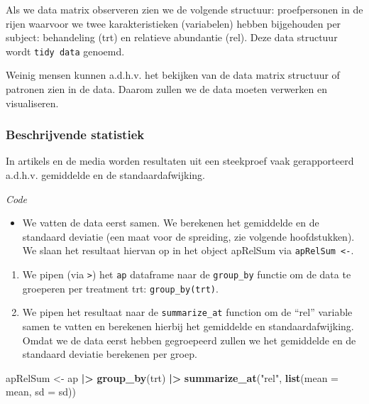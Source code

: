 \documentclass[
  12pt,dutch]{book}
\newenvironment{Shaded}{\begin{snugshade}}{\end{snugshade}}
\newcommand{\AttributeTok}[1]{\textcolor[rgb]{0.13,0.29,0.53}{#1}}
\newcommand{\FunctionTok}[1]{\textcolor[rgb]{0.13,0.29,0.53}{\textbf{#1}}}
\newcommand{\NormalTok}[1]{#1}
\newcommand{\OtherTok}[1]{\textcolor[rgb]{0.56,0.35,0.01}{#1}}
\newcommand{\SpecialCharTok}[1]{\textcolor[rgb]{0.81,0.36,0.00}{\textbf{#1}}}
\newcommand{\StringTok}[1]{\textcolor[rgb]{0.31,0.60,0.02}{#1}}
\providecommand{\tightlist}{%
  \setlength{\itemsep}{0pt}\setlength{\parskip}{0pt}}
\theoremstyle{definition}
\theoremstyle{definition}
\theoremstyle{definition}
\theoremstyle{definition}
\theoremstyle{remark}
\begin{document}
Als we data matrix observeren zien we de volgende structuur:
proefpersonen in de rijen waarvoor we twee karakteristieken (variabelen) hebben bijgehouden per subject:
behandeling (trt) en relatieve abundantie (rel).
Deze data structuur wordt \texttt{tidy\ data} genoemd.

Weinig mensen kunnen a.d.h.v. het bekijken van de data matrix structuur of patronen zien in de data. Daarom zullen we de data moeten verwerken en visualiseren.

\subsubsection{Beschrijvende statistiek}\label{beschrijvende-statistiek}

In artikels en de media worden resultaten uit een steekproef vaak gerapporteerd a.d.h.v. gemiddelde en de standaardafwijking.

\emph{Code}

\begin{itemize}
\tightlist
\item
  We vatten de data eerst samen. We berekenen het gemiddelde en de standaard deviatie (een maat voor de spreiding, zie volgende hoofdstukken).
  We slaan het resultaat hiervan op in het object apRelSum via \texttt{apRelSum\ \textless{}-}.
\end{itemize}

\begin{enumerate}
\def\labelenumi{\arabic{enumi}.}
\item
  We pipen (via \texttt{\textbar{}\textgreater{}}) het \texttt{ap} dataframe naar de \texttt{group\_by} functie om de data te groeperen per treatment trt: \texttt{group\_by(trt)}.
\item
  We pipen het resultaat naar de \texttt{summarize\_at} function om de ``rel'' variable samen te vatten en berekenen hierbij het gemiddelde en standaardafwijking. Omdat we de data eerst hebben gegroepeerd zullen we het gemiddelde en de standaard deviatie berekenen per groep.
\end{enumerate}

\begin{Shaded}
\begin{Highlighting}[]
\NormalTok{apRelSum }\OtherTok{\textless{}{-}}\NormalTok{ ap }\SpecialCharTok{|\textgreater{}}
    \FunctionTok{group\_by}\NormalTok{(trt) }\SpecialCharTok{|\textgreater{}}
    \FunctionTok{summarize\_at}\NormalTok{(}\StringTok{"rel"}\NormalTok{, }\FunctionTok{list}\NormalTok{(}\AttributeTok{mean =}\NormalTok{ mean, }\AttributeTok{sd =}\NormalTok{ sd))}
\end{Highlighting}
\end{Shaded}
\end{document}
